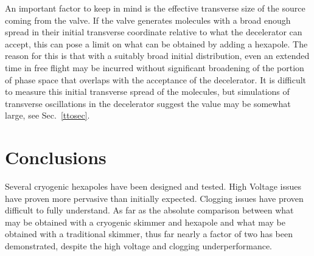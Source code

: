 An important factor to keep in mind is the effective transverse size of the source coming from the valve.
If the valve generates molecules with a broad enough spread in their initial transverse coordinate relative to what the decelerator can accept, this can pose a limit on what can be obtained by adding a hexapole.
The reason for this is that with a suitably broad initial distribution, even an extended time in free flight may be incurred without significant broadening of the portion of phase space that overlaps with the acceptance of the decelerator.
It is difficult to measure this initial transverse spread of the molecules, but simulations of transverse oscillations in the decelerator suggest the value may be somewhat large, see Sec.~\ref{ttosec}.

\section{Conclusions}

Several cryogenic hexapoles have been designed and tested.
High Voltage issues have proven more pervasive than initially expected.
Clogging issues have proven difficult to fully understand.
As far as the absolute comparison between what may be obtained with a cryogenic skimmer and hexapole and what may be obtained with a traditional skimmer, thus far nearly a factor of two has been demonstrated, despite the high voltage and clogging underperformance.












\ifx\justbeingincluded\undefined

\fi
